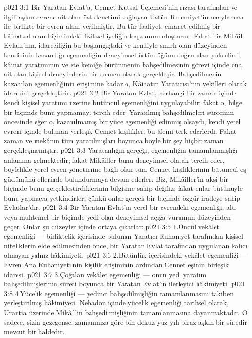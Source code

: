 \vs p021 3:1 Bir Yaratan Evlat’a, Cennet Kutsal Üçlemesi’nin rızası tarafından ve ilgili aşkın evrene ait olan üst denetimi sağlayan Üstün Ruhaniyet’in onaylaması ile birlikte bir evren alanı verilmiştir. Bu tür faaliyet, emanet edilmiş bir kâinatsal alan biçimindeki fiziksel iyeliğin kapsamını oluşturur. Fakat bir Mikâil Evladı’nın, idareciliğin bu başlangıçtaki ve kendiyle sınırlı olan düzeyinden kendisinin kazandığı egemenliğin deneyimsel üstünlüğüne doğru olan yükselimi; kâinat yaratımının ve ete kemiğe bürünmenin bahşedilmesinin görevi içinde ona ait olan kişisel deneyimlerin bir sonucu olarak gerçekleşir. Bahşedilmenin kazanılan egemenliğinin erişimine kadar o, Kâinatın Yaratıcısı’nın vekilleri olarak idaresini gerçekleştirir.
\vs p021 3:2 Bir Yaratan Evlat, herhangi bir zaman içinde kendi kişisel yaratımı üzerine bütüncül egemenliğini uygulayabilir; fakat o, bilge bir biçimde bunu yapmamayı tercih eder. Yaratılmış bahşedilmeleri sürecinin öncesinde eğer o, kazanılmamış bir yüce egemenliği edinmiş olsaydı, kendi yerel evreni içinde bulunan yerleşik Cennet kişilikleri bu âlemi terk ederlerdi. Fakat zaman ve mekânın tüm yaratılmışları boyunca böyle bir şey hiçbir zaman gerçekleşmemiştir.
\vs p021 3:3 Yaratanlığın gerçeği, egemenliğin tamamlanmışlığı anlamına gelmektedir; fakat Mikâiller bunu deneyimsel olarak  tercih eder, böylelikle yerel evren yönetimine bağlı olan tüm Cennet kişiliklerinin bütüncül eş güdümünü ellerinde bulundurmaya devam ederler. Biz, Mikâiller’in aksi bir biçimde bunu gerçekleştirdiklerinin bilgisine sahip değiliz; fakat onlar bütünüyle bunu yapmaya yetkindirler, çünkü onlar gerçek bir biçimde özgür iradeye sahip Evlatlar’dır.
\vs p021 3:4 Bir Yaratan Evlat’ın yerel bir evrendeki egemenliği, altı veya muhtemel bir biçimde yedi olan deneyimsel açığa vurumun düzeyinden geçer. Onlar şu düzeyler içinde ortaya çıkarlar:
\vs p021 3:5 1.\bibnobreakspace Öncül vekâlet egemenliği --- birliktelik içerisinde bulunan Yaratıcı Ruhaniyet tarafından kişisel niteliklerin elde edilmesinden önce, bir Yaratan Evlat tarafından uygulanan kalıcı olmayan yalnız hâkimiyeti.
\vs p021 3:6 2.\bibnobreakspace Bütünlük içerisindeki vekâlet egemenliği --- Evren Ana Ruhaniyeti’nin kişilik erişiminin ardından Cennet eşinin birleşik idaresi.
\vs p021 3:7 3.\bibnobreakspace Çoğalan vekâlet egemenliği --- onun yedi yaratım bahşedilmişlerinin süreci boyunca bir Yaratan Evlat’ın ilerleyici hâkimiyeti.
\vs p021 3:8 4.\bibnobreakspace Yücelik egemenliği --- yedinci bahşedilmişliğin tamamlanmasını takiben yerleştirilmiş hâkimiyeti. Nebadon içinde yücelik egemenliği tarihsel olarak, Urantia üzerinde Mikâil’in bahşedilmişliğinin tamamlanmasına dayanmaktadır. O sadece, sizin gezegensel zamanınıza göre bin dokuz yüz yılı biraz aşkın bir süredir mevcut bir haldedir.
